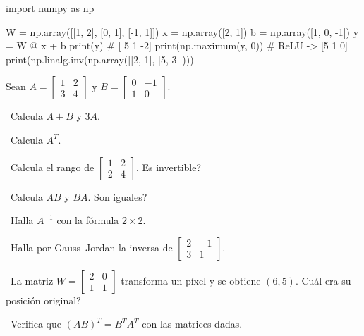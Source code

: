 \begin{tmcodigo}
import numpy as np

W = np.array([[1, 2], [0, 1], [-1, 1]])
x = np.array([2, 1])
b = np.array([1, 0, -1])
y = W @ x + b
print(y)                      # [ 5  1 -2]
print(np.maximum(y, 0))       # ReLU -> [5 1 0]
print(np.linalg.inv(np.array([[2, 1], [5, 3]])))
\end{tmcodigo}

\begin{tmejercicios}
\label{ej:3-3}
Sean $A=\begin{bmatrix}1&2\\3&4\end{bmatrix}$ y $B=\begin{bmatrix}0&-1\\1&0\end{bmatrix}$.
\begin{tmlista}
\item \tmbasico\ Calcula $A+B$ y $3A$.
\item \tmbasico\ Calcula $A^T$.
\item \tmbasico\ Calcula el rango de $\begin{bmatrix}1&2\\2&4\end{bmatrix}$. \textquestiondown Es invertible?
\item \tmmedio\ Calcula $AB$ y $BA$. \textquestiondown Son iguales?
\item \tmmedio\ Halla $A^{-1}$ con la f\'ormula $2\times2$.
\item \tmmedio\ Halla por Gauss--Jordan la inversa de $\begin{bmatrix}2&-1\\3&1\end{bmatrix}$.
\item \tmdificil\ La matriz $W=\begin{bmatrix}2&0\\1&1\end{bmatrix}$ transforma un p\'ixel y se obtiene $(6, 5)$. \textquestiondown Cu\'al era su posici\'on original?
\item \tmdificil\ Verifica que $(AB)^T=B^TA^T$ con las matrices dadas.
\end{tmlista}
\end{tmejercicios}


